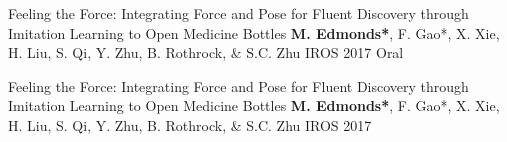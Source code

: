


\begin{cvpublications}

\item \cvpublication
{Feeling the Force: Integrating Force and Pose for Fluent Discovery through Imitation Learning to Open Medicine Bottles} %
{\textbf{M. Edmonds*}, F. Gao*, X. Xie, H. Liu, S. Qi, Y. Zhu, B. Rothrock, \& S.C. Zhu} %
{IROS 2017} %
{Oral}

\item \cvpublication
{Feeling the Force: Integrating Force and Pose for Fluent Discovery through Imitation Learning to Open Medicine Bottles} %
{\textbf{M. Edmonds*}, F. Gao*, X. Xie, H. Liu, S. Qi, Y. Zhu, B. Rothrock, \& S.C. Zhu} %
{IROS 2017} %
{}


\end{cvpublications}